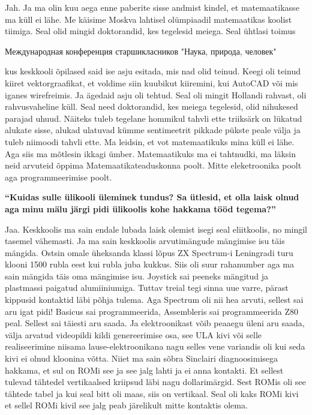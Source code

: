 Jah. Ja ma olin kuu aega enne paberite sisse andmist kindel, et matemaatikasse ma küll ei lähe. Me käisime Moskva lahtisel olümpiaadil matemaatikas koolist tiimiga. Seal olid mingid doktorandid, kes tegelesid meiega. Seal ühtlasi toimus \begin{russian}Международная конференция старшикласников "Наука, природа, человек"\end{russian} kus keskkooli õpilased said ise asju esitada, mis nad olid teinud. Keegi oli teinud kiiret vektorgraafikat, et voldime siin kuubikut kiiremini, kui AutoCAD või mis iganes wirefreimis. Ja ägedaid asju oli tehtud. Seal oli mingit Hollandi rahvast, oli rahvusvaheline küll. Seal need doktorandid, kes meiega tegelesid, olid nihukesed parajad uhuud. Näiteks tuleb tegelane hommikul tahvli ette triiksärk on lükatud alukate sisse, alukad ulatuvad kümme sentimeetrit pikkade pükste peale välja ja tuleb niimoodi tahvli ette. Ma leidsin, et vot matemaatikuks mina küll ei lähe. Aga siis ma mõtlesin ikkagi ümber. Matemaatikuks ma ei tahtnudki, ma läksin neid arvuteid õppima Matemaatikateaduskonna poolt. Mitte eleketroonika poolt aga programmeerimise poolt. 

\textbf{\enquote{Kuidas sulle ülikooli üleminek tundus? Sa ütlesid, et olla laisk olnud aga minu mälu järgi pidi ülikoolis kohe hakkama tööd tegema?}}

Jaa. Keskkoolis ma sain endale lubada laisk olemist isegi seal eliitkoolis, no mingil tasemel vähemasti. Ja ma sain keskkoolis arvutimängude mängimise isu täis mängida. Ostsin omale üheksanda klassi lõpus ZX Spectrum-i Leningradi turu klooni 1500 rubla eest kui rubla juba kukkus. Siis oli suur rahanumber aga ma sain mängida täis oma mängimise isu. Joystick sai peeneks mängitud ja plastmassi paigatud alumiiniumiga. Tuttav treial tegi sinna uue varre, pärast kippusid kontaktid läbi põhja tulema. Aga Spectrum oli nii hea arvuti, sellest sai aru igat pidi! Basicus sai programmeerida, Assembleris sai programmeerida Z80 peal. Sellest sai täiesti aru saada. Ja elektroonikast võib peaaegu üleni aru saada, välja arvatud videopildi kildi genereerimise osa, see ULA kivi või selle realiseerimine niisama lause-elektroonikana nagu selles vene variandis oli kui seda kivi ei olnud kloonina võtta. Niiet ma sain sõbra Sinclairi diagnoosimisega hakkama, et sul on ROMi see ja see jalg lahti ja ei anna kontakti. Et sellest tulevad tähtedel vertikaalsed kriipsud läbi nagu dollarimärgid. Sest ROMis oli see tähtede tabel ja kui seal bitt oli maas, siis on vertikaal. Seal oli kaks ROMi kivi et sellel ROMi kivil see jalg peab järelikult mitte kontaktis olema. 

